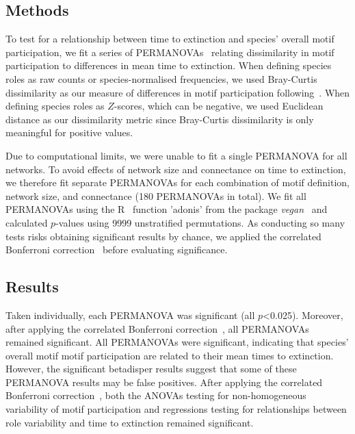 \documentclass[12pt]{article}
\begin{document}
\begin{spacing}{2.0}
	\subsection*{Methods}


		To test for a relationship between time to extinction and species' overall motif participation, we fit a series of PERMANOVAs~\citep{Anderson2001} relating dissimilarity in motif participation to differences in mean time to extinction.
		When defining species roles as raw counts or species-normalised frequencies, we used Bray-Curtis dissimilarity as our measure of differences in motif participation following~\citet{Baker2015,Cirtwill2015}.
		When defining species roles as $Z$-scores, which can be negative, we used Euclidean distance as our dissimilarity metric since Bray-Curtis dissimilarity is only meaningful for positive values.


		Due to computational limits, we were unable to fit a single PERMANOVA for all networks.
		To avoid effects of network size and connectance on time to extinction, we therefore fit separate PERMANOVAs for each combination of motif definition, network size, and connectance (180 PERMANOVAs in total).
		We fit all PERMANOVAs using the R~\citep{R} function 'adonis' from the package \emph{vegan}~\citep{vegan} and calculated $p$-values using 9999 unstratified permutations.
		As conducting so many tests risks obtaining significant results by chance, we applied the correlated Bonferroni correction~\citep{Drezner2016} before evaluating significance.

	\subsection*{Results}


		Taken individually, each PERMANOVA was significant (all $p$\textless0.025). Moreover, after applying the correlated Bonferroni correction~\citep{Drezner2016}, all PERMANOVAs remained significant.
		All PERMANOVAs were significant, indicating that species' overall motif motif participation are related to their mean times to extinction.
		However, the significant betadisper results suggest that some of these PERMANOVA results may be false positives.
		After applying the correlated Bonferroni correction~\citep{Drezner2016}, both the ANOVAs testing for non-homogeneous variability of motif participation and regressions testing for relationships between role variability and time to extinction remained significant.



\end{spacing}
\end{document}
